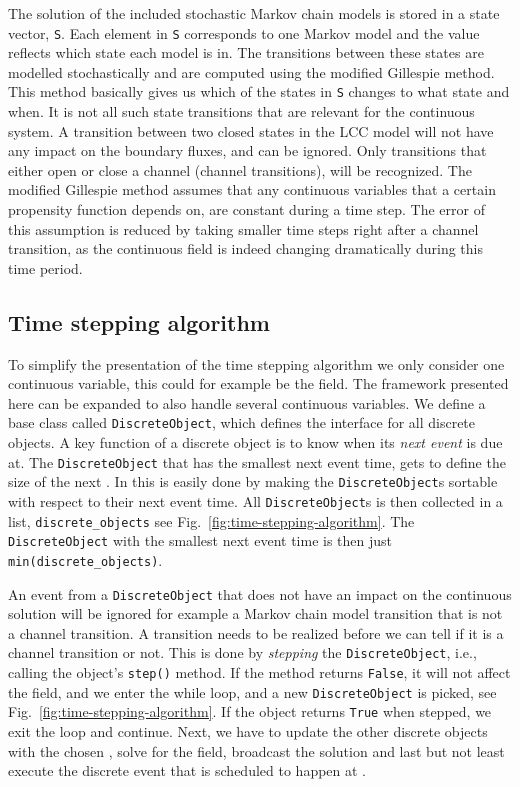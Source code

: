 The solution of the included stochastic Markov chain models is stored in a state vector, \texttt{S}. Each element in \texttt{S} corresponds to one Markov model and the value reflects which state each model is in. The transitions between these states are modelled stochastically and are computed using the modified Gillespie method. This method basically gives us which of the states in \texttt{S} changes to what state and when. It is not all such state transitions that are relevant for the continuous system. A transition between two closed states in the LCC model will not have any impact on the boundary fluxes, and can be ignored. Only transitions that either open or close a channel (channel transitions), will be recognized. The modified Gillespie method assumes that any continuous variables that a certain propensity function depends on, are constant during a time step. The error of this assumption is reduced by taking smaller time steps right after a channel transition, as the continuous field is indeed changing dramatically during this time period. \par

\subsection*{Time stepping algorithm}
\label{sec:event-driven-simulator}
To simplify the presentation of the time stepping algorithm we only consider one continuous variable, this could for example be the \Ca field. The framework presented here can be expanded to also handle several continuous variables. We define a base class called \texttt{DiscreteObject}, which defines the interface for all discrete objects. A key function of a discrete object is to know when its \textit{next event} is due at. The \texttt{DiscreteObject} that has the smallest next event time, gets to define the size of the next \Dt. In \python this is easily done by making the \texttt{DiscreteObject}s sortable with respect to their next event time. All \texttt{DiscreteObject}s is then collected in a list, \texttt{discrete\_objects} see Fig.~\ref{fig:time-stepping-algorithm}. The \texttt{DiscreteObject} with the smallest next event time is then just \texttt{min(discrete\_objects)}.\par

An event from a \texttt{DiscreteObject} that does not have an impact on the continuous solution will be ignored for example a Markov chain model transition that is not a channel transition. A transition needs to be realized before we can tell if it is a channel transition or not. This is done by \textit{stepping} the \texttt{DiscreteObject}, i.e., calling the object's \texttt{step()} method. If the method returns \texttt{False}, it will not affect the \Ca field, and we enter the while loop, and a new \texttt{DiscreteObject} is picked, see Fig.~\ref{fig:time-stepping-algorithm}. If the object returns \texttt{True} when stepped, we exit the loop and continue. Next, we have to update the other discrete objects with the chosen \Dt, solve for the \Ca field, broadcast the solution and last but not least execute the discrete event that is scheduled to happen at \Dt.\par

